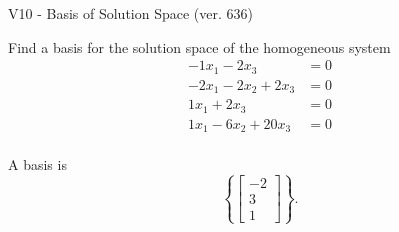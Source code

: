 \begin{exercise}
  \begin{exerciseTitle}V10 - Basis of Solution Space (ver. 636)\end{exerciseTitle}
  \begin{exerciseStatement}
    Find a basis for the solution space of the homogeneous system 
\begin{align*}
 -1 x_ 1 -2 x_ 3 &= 0  \\ 
  -2 x_ 1 -2 x_ 2 + 2 x_ 3 &= 0  \\ 
  1 x_ 1 + 2 x_ 3 &= 0  \\ 
  1 x_ 1 -6 x_ 2 + 20 x_ 3 &= 0  \\ 
 \end{align*}


 
  \end{exerciseStatement}

  \begin{exerciseAnswer}
   A basis is   
\[\left\{\left[\begin{array}{c}
-2 \\
3 \\
1
\end{array}\right]\right\}.\]

  


  \end{exerciseAnswer}
\end{exercise}